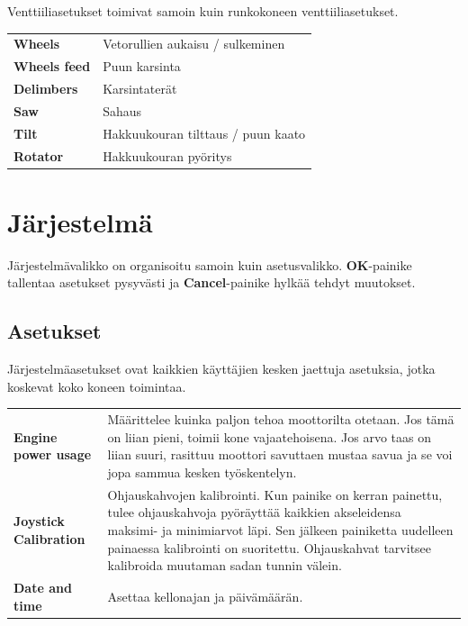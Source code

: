 \documentclass[12pt,a4paper,finnish]{uvmanual}
\begin{document}
Venttiiliasetukset toimivat samoin kuin runkokoneen venttiiliasetukset.


\begin{tabular}{ L{0.2\textwidth} L{0.66\textwidth} }
\textbf{Wheels} & Vetorullien aukaisu / sulkeminen \\
\textbf{Wheels feed} & Puun karsinta \\
\textbf{Delimbers} & Karsintaterät \\
\textbf{Saw} & Sahaus \\
\textbf{Tilt} & Hakkuukouran tilttaus / puun kaato \\
\textbf{Rotator} & Hakkuukouran pyöritys \\
\end{tabular}

\chapter{Järjestelmä}\label{ch:system}

Järjestelmävalikko on organisoitu samoin kuin asetusvalikko. \textbf{OK}-painike tallentaa asetukset pysyvästi ja \textbf{Cancel}-painike hylkää tehdyt muutokset.

\section{Asetukset}\label{ch:system_settings}

Järjestelmäasetukset ovat kaikkien käyttäjien kesken jaettuja asetuksia, jotka koskevat koko koneen toimintaa.



\begin{tabular}{ L{0.2\textwidth} L{0.66\textwidth} }
\textbf{Engine power usage} & Määrittelee kuinka paljon tehoa moottorilta otetaan. Jos tämä on liian pieni, toimii kone vajaatehoisena. Jos arvo taas on liian suuri, rasittuu moottori savuttaen mustaa savua ja se voi jopa sammua kesken työskentelyn. \\
\textbf{Joystick Calibration} & Ohjauskahvojen kalibrointi. Kun painike on kerran painettu, tulee ohjauskahvoja pyöräyttää kaikkien akseleidensa maksimi- ja minimiarvot läpi. Sen jälkeen painiketta uudelleen painaessa kalibrointi on suoritettu. Ohjauskahvat tarvitsee kalibroida muutaman sadan tunnin välein. \\
\textbf{Date and time} & Asettaa kellonajan ja päivämäärän. \\
\end{tabular}
\end{document}
